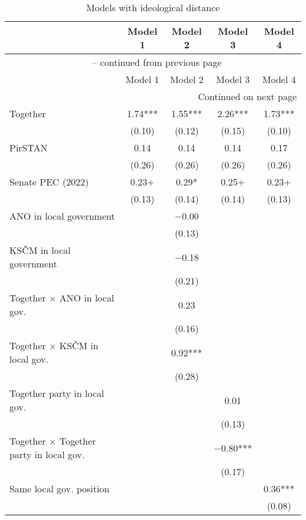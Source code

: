 \begin{longtable}{lcccc}
\caption{Models with ideological distance}\label{tab:3}\\
\toprule
  & Model 1 & Model 2 & Model 3 & Model 4\\
\midrule
\endfirsthead

\multicolumn{5}{c}{{\tablename\ \thetable{} -- continued from previous page}} \\
\toprule
  & Model 1 & Model 2 & Model 3 & Model 4\\
\midrule
\endhead

\bottomrule
\multicolumn{5}{r}{{Continued on next page}} \\
\endfoot

\bottomrule
\endlastfoot

Together & \num{1.74}*** & \num{1.55}*** & \num{2.26}*** & \num{1.73}***\\
 & (\num{0.10}) & (\num{0.12}) & (\num{0.15}) & (\num{0.10})\\
PirSTAN & \num{0.14} & \num{0.14} & \num{0.14} & \num{0.17}\\
 & (\num{0.26}) & (\num{0.26}) & (\num{0.26}) & (\num{0.26})\\
Senate PEC (2022) & \num{0.23}+ & \num{0.29}* & \num{0.25}+ & \num{0.23}+\\
 & (\num{0.13}) & (\num{0.14}) & (\num{0.14}) & (\num{0.13})\\
ANO in local government &  & \num{-0.00} &  & \\
 &  & (\num{0.13}) &  & \\
KSČM in local government &  & \num{-0.18} &  & \\
 &  & (\num{0.21}) &  & \\
Together $\times$ ANO in local gov. &  & \num{0.23} &  & \\
 &  & (\num{0.16}) &  & \\
Together $\times$ KSČM in local gov. &  & \num{0.92}*** &  & \\
 &  & (\num{0.28}) &  & \\
Together party in local gov. &  &  & \num{0.01} & \\
 &  &  & (\num{0.13}) & \\
Together $\times$ Together party in local gov. &  &  & \num{-0.80}*** & \\
 &  &  & (\num{0.17}) & \\
Same local gov. position &  &  &  & \num{0.36}***\\
 &  &  &  & (\num{0.08})\\

\end{longtable}
